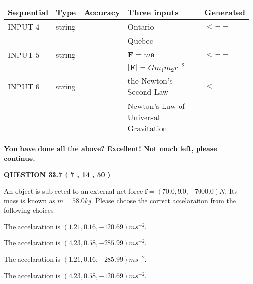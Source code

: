 \documentclass[12pt]{article}
\begin{document}
  
\noindent\begin{tabular}{|l|l|l|l|l|}
\hline
 Sequential & Type & Accuracy & Three inputs & Generated \\ 
\hline
 
 
  INPUT $            4 $ & string & & 
 Ontario & 
  $ <-- $ 
  \\
  & & & 
 Quebec & 
 \\  \hline  
 
 
  INPUT $            5 $ & string & & 
 $\mathbf{F}=m\mathbf{a}$ & 
  $ <-- $ 
  \\
  & & & 
 $\left| \mathbf{F}\right| =Gm_1m_2r^{-2}$ & 
 \\  \hline  
 
 
  INPUT $            6 $ & string & & 
 the Newton's Second Law & 
  $ <-- $ 
  \\
  & & & 
 Newton's Law of Universal Gravitation & 
 \\  \hline  
 \end{tabular}
   
   
   
   
\vspace{0.3in}
{\textbf{\LARGE{You have done all the above? Excellent! Not much left, please continue.}}}
\vspace{0.3in}
   
   
  
\vspace{0.2in}
  
{\textbf{\Large{QUESTION
33.7 
 (           7 ,          14 ,          50 )
}}}
  
  
 
An object is subjected to an external net force $\mathbf{f}=
(70.0 , 9.0 , -7000.0) N$.
Its mass is known as $m= %
58.0 kg$.
Please choose the correct accelaration from the following choices.
 
 
  The accelaration is $  %
(
1.21,
0.16,
-120.69)
ms^{-2} $.
 
 
  The accelaration is $  %
(
4.23,
0.58,
-285.99)
ms^{-2} $.
 
 
  The accelaration is $  %
(
1.21,
0.16,
-285.99)
ms^{-2} $.
 
 
  The accelaration is $  %
(
4.23,
0.58,
-120.69)
ms^{-2} $.
 
 
\noindent{}
 
\end{document}
